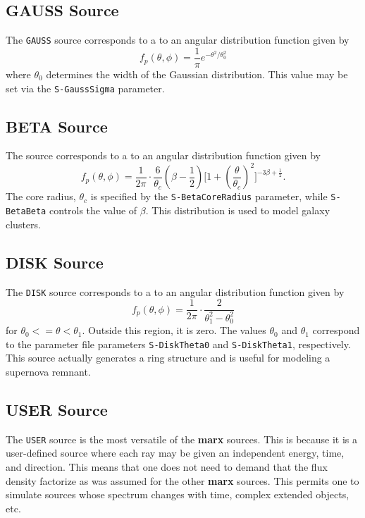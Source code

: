 \documentclass{article}
\newcommand{\marx}{{\bf marx}}
\begin{document}
\subsection{GAUSS Source}
 The \verb|GAUSS| source corresponds to a to an angular distribution
 function given by
\begin{equation}
  f_p(\theta, \phi) = \frac{1}{\pi} e^{-\theta^2/\theta_0^2}
\end{equation}
 where $\theta_0$ determines the width of the Gaussian distribution.
 This value may be set via the \verb|S-GaussSigma| parameter.

\subsection{BETA Source}
 The \verb|| source corresponds to a to an angular distribution
 function given by
\begin{equation}
  f_p(\theta, \phi) = \frac{1}{2\pi}
    \cdot 
      \frac{6}{\theta_c}(\beta - \frac{1}{2})
      \big[ 1 + (\frac{\theta}{\theta_c})^2 \big]^{-3\beta + \frac{1}{2}}.
\end{equation}
 The core radius, $\theta_c$ is specified by the
 \verb|S-BetaCoreRadius| parameter, while \verb|S-BetaBeta| controls
 the value of $\beta$.
 This distribution is used to model galaxy clusters.

\subsection{DISK Source}
 The \verb|DISK| source corresponds to a to an angular distribution
 function given by
\begin{equation}
  f_p(\theta, \phi) = \frac{1}{2\pi}
       \cdot \frac{2}{\theta_1^2 - \theta_0^2}
\end{equation}
 for $\theta_0 <= \theta < \theta_1$.  Outside this region, it is zero.
 The values $\theta_0$ and $\theta_1$ correspond to the parameter file
 parameters \verb|S-DiskTheta0| and \verb|S-DiskTheta1|, respectively.
 This source actually generates a ring structure and is useful for
 modeling a supernova remnant.

\subsection{USER Source}

 The \verb|USER| source is the most versatile of the \marx{}
 sources. This is because it is a user-defined source where each ray
 may be given an independent energy, time, and direction.  This means
 that one does not need to demand that the flux density factorize as
 was assumed for the other \marx{} sources.  This permits one to
 simulate sources whose spectrum changes with time, complex extended
 objects, etc.
\end{document}
